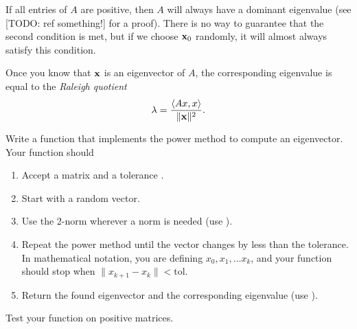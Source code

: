 If all entries of $A$ are positive, then $A$ will always have a dominant eigenvalue (see [TODO: ref something!] for a proof). 
There is no way to guarantee that the second condition is met, but if we choose ${\bf x}_0$ randomly, it will almost always satisfy this condition.

Once you know that ${\bf x}$ is an eigenvector of $A$, the corresponding eigenvalue is equal to the \emph{Raleigh quotient}
\[
\lambda = \frac{\langle Ax, x \rangle}{\|{\bf x}\|^2}.
\]



\begin{problem}
Write a function that implements the power method to compute an eigenvector. Your function should
\begin{enumerate}
\item Accept a matrix and a tolerance .
\item Start with a random vector.
\item Use the 2-norm wherever a norm is needed (use ).
\item Repeat the power method until the vector changes by less than the tolerance. In mathematical notation, you are defining $x_0, x_1, \ldots x_k$, and your function should stop when $\|x_{k+1}-x_k\| < \text{tol}$.
\item Return the found eigenvector and the corresponding eigenvalue (use ).
\end{enumerate} 
Test your function on positive matrices.
\end{problem}

